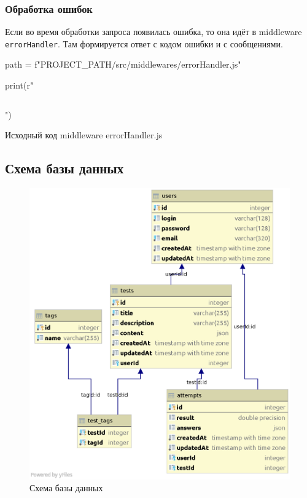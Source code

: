 \subsubsection{Обработка ошибок}
Если во время обработки запроса появилась ошибка, то она идёт в middleware \texttt{errorHandler}. Там формируется ответ с кодом ошибки и с сообщениями.

\begin{listing}[H]
\begin{pycode}
path = f"{PROJECT_PATH}/src/middlewares/errorHandler.js"

print(r"\inputminted{js}{" + path + r"}")
\end{pycode}
\caption{Исходный код middleware errorHandler.js}
\end{listing}

\subsection{Схема базы данных}
\begin{figure}[h!]
    \begin{center}
        \includegraphics[scale=0.6]{images/db_scheme.eps}
    \end{center}
    \caption{Схема базы данных}
\end{figure}

